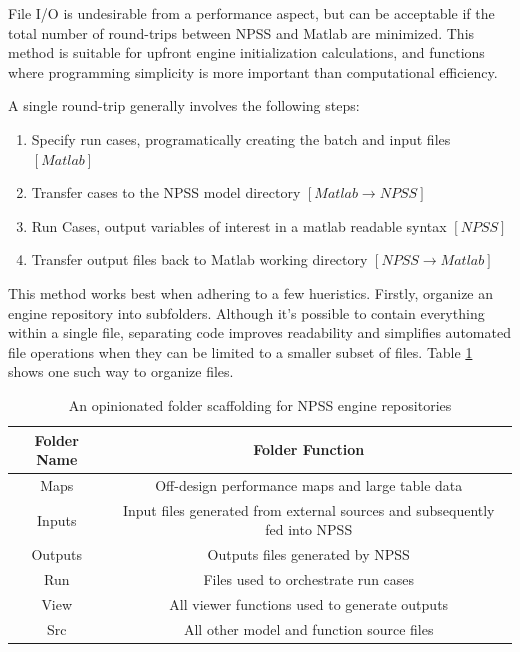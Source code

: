 \documentclass[heading.tex]{subfiles}
\begin{document}
File I/O is undesirable from a performance aspect, but can be acceptable if the total number of round-trips between
NPSS and Matlab are minimized. This method is suitable for upfront engine initialization calculations, 
and functions where programming simplicity is more important than computational efficiency.

A single round-trip generally involves the following steps:

\begin{enumerate}
  \item Specify run cases, programatically creating the batch and input files $[Matlab]$
  \item Transfer cases to the NPSS model directory $[Matlab \rightarrow NPSS]$
  \item Run Cases, output variables of interest in a matlab readable syntax $[NPSS]$
  \item Transfer output files back to Matlab working directory $[NPSS \rightarrow Matlab]$
\end{enumerate}

This method works best when adhering to a few hueristics. Firstly, organize an engine repository
into subfolders. Although it's possible to contain everything within a single file, separating code
improves readability and simplifies automated file operations when they can be limited to a smaller subset of files.
Table \ref{tab:Scaffolding} shows one such way to organize files.

\begin{table}[H]
\centering
\begin{tabular}{|c|c|}
\hline 
Folder Name & Folder Function \\ 
\hline \hline
Maps & Off-design performance maps and large table data \\ 
\hline 
Inputs & Input files generated from external sources and subsequently fed into NPSS \\ 
\hline 
Outputs & Outputs files generated by NPSS \\ 
\hline 
Run & Files used to orchestrate run cases \\ 
\hline 
View & All viewer functions used to generate outputs \\ 
\hline 
Src & All other model and function source files \\ 
\hline 
\end{tabular} 
\caption{An opinionated folder scaffolding for NPSS engine repositories}
\label{tab:Scaffolding}
\end{table}
\end{document}
